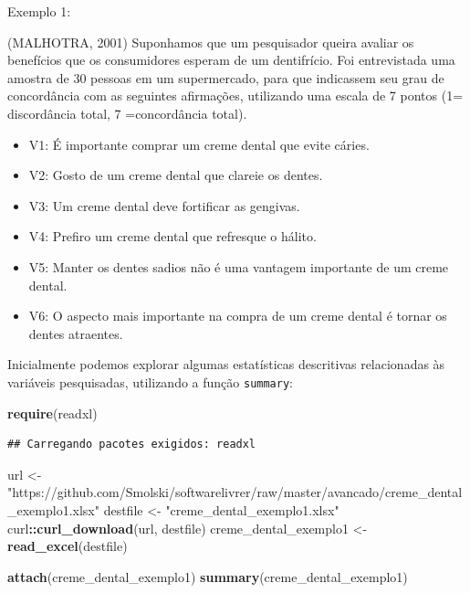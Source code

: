 \documentclass[12pt,brazil,]{book}
\newenvironment{Shaded}{\begin{snugshade}}{\end{snugshade}}
\newcommand{\KeywordTok}[1]{\textcolor[rgb]{0.13,0.29,0.53}{\textbf{#1}}}
\newcommand{\NormalTok}[1]{#1}
\newcommand{\OperatorTok}[1]{\textcolor[rgb]{0.81,0.36,0.00}{\textbf{#1}}}
\newcommand{\StringTok}[1]{\textcolor[rgb]{0.31,0.60,0.02}{#1}}
\providecommand{\tightlist}{%
  \setlength{\itemsep}{0pt}\setlength{\parskip}{0pt}}
\begin{document}
Exemplo 1:

(MALHOTRA, 2001) Suponhamos que um pesquisador queira avaliar os
benefícios que os consumidores esperam de um dentifrício. Foi
entrevistada uma amostra de 30 pessoas em um supermercado, para que
indicassem seu grau de concordância com as seguintes afirmações,
utilizando uma escala de 7 pontos (1= discordância total, 7
=concordância total).

\begin{itemize}
\tightlist
\item
  V1: É importante comprar um creme dental que evite cáries.
\item
  V2: Gosto de um creme dental que clareie os dentes.
\item
  V3: Um creme dental deve fortificar as gengivas.
\item
  V4: Prefiro um creme dental que refresque o hálito.
\item
  V5: Manter os dentes sadios não é uma vantagem importante de um creme
  dental.
\item
  V6: O aspecto mais importante na compra de um creme dental é tornar os
  dentes atraentes.
\end{itemize}

Inicialmente podemos explorar algumas estatísticas descritivas
relacionadas às variáveis pesquisadas, utilizando a função
\texttt{summary}:

\begin{Shaded}
\begin{Highlighting}[]
\KeywordTok{require}\NormalTok{(readxl)}
\end{Highlighting}
\end{Shaded}

\begin{verbatim}
## Carregando pacotes exigidos: readxl
\end{verbatim}

\begin{Shaded}
\begin{Highlighting}[]
\NormalTok{url <-}\StringTok{ "https://github.com/Smolski/softwarelivrer/raw/master/avancado/creme_dental_exemplo1.xlsx"}
\NormalTok{destfile <-}\StringTok{ "creme_dental_exemplo1.xlsx"}
\NormalTok{curl}\OperatorTok{::}\KeywordTok{curl_download}\NormalTok{(url, destfile)}
\NormalTok{creme_dental_exemplo1 <-}\StringTok{ }\KeywordTok{read_excel}\NormalTok{(destfile)}

\KeywordTok{attach}\NormalTok{(creme_dental_exemplo1)}
\KeywordTok{summary}\NormalTok{(creme_dental_exemplo1)}
\end{Highlighting}
\end{Shaded}
\end{document}
